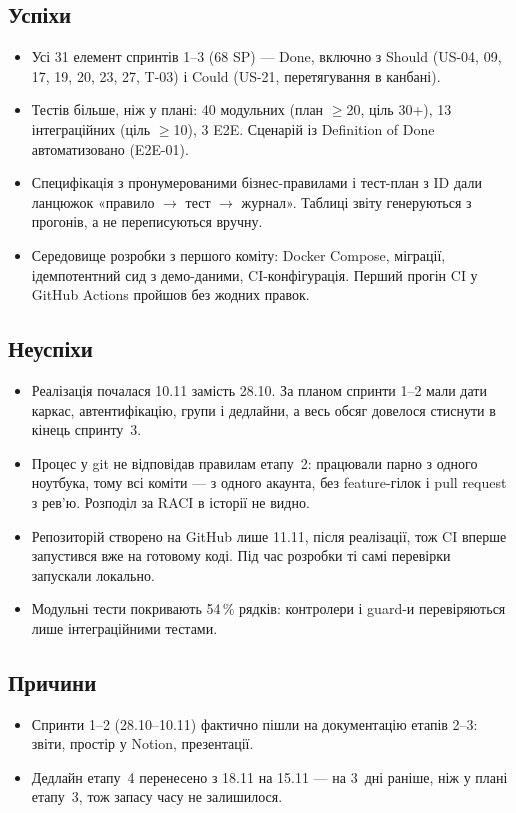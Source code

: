 \documentclass[12pt]{article}
\begin{document}
\subsection*{Успіхи}
\begin{itemize}[leftmargin=1.2em,itemsep=2pt]
  \item Усі 31 елемент спринтів 1--3 (68 SP) --- Done, включно з Should (US-04, 09, 17, 19, 20, 23, 27, T-03) і Could (US-21, перетягування в канбані).
  \item Тестів більше, ніж у плані: 40 модульних (план $\geq$20, ціль 30+), 13 інтеграційних (ціль $\geq$10), 3 E2E. Сценарій із Definition of Done автоматизовано (E2E-01).
  \item Специфікація з пронумерованими бізнес-правилами і тест-план з ID дали ланцюжок «правило $\to$ тест $\to$ журнал». Таблиці звіту генеруються з прогонів, а не переписуються вручну.
  \item Середовище розробки з першого коміту: Docker Compose, міграції, ідемпотентний сид з демо-даними, CI-конфігурація. Перший прогін CI у GitHub Actions пройшов без жодних правок.
\end{itemize}
\subsection*{Неуспіхи}
\begin{itemize}[leftmargin=1.2em,itemsep=2pt]
  \item Реалізація почалася 10.11 замість 28.10. За планом спринти 1--2 мали дати каркас, автентифікацію, групи і дедлайни, а весь обсяг довелося стиснути в кінець спринту~3.
  \item Процес у git не відповідав правилам етапу~2: працювали парно з одного ноутбука, тому всі коміти --- з одного акаунта, без feature-гілок і pull request з рев'ю. Розподіл за RACI в історії не видно.
  \item Репозиторій створено на GitHub лише 11.11, після реалізації, тож CI вперше запустився вже на готовому коді. Під час розробки ті самі перевірки запускали локально.
  \item Модульні тести покривають 54\,\% рядків: контролери і guard-и перевіряються лише інтеграційними тестами.
\end{itemize}
\subsection*{Причини}
\begin{itemize}[leftmargin=1.2em,itemsep=2pt]
  \item Спринти 1--2 (28.10--10.11) фактично пішли на документацію етапів 2--3: звіти, простір у Notion, презентації.
  \item Дедлайн етапу~4 перенесено з 18.11 на 15.11 --- на 3~дні раніше, ніж у плані етапу~3, тож запасу часу не залишилося.
\end{itemize}
\end{document}

